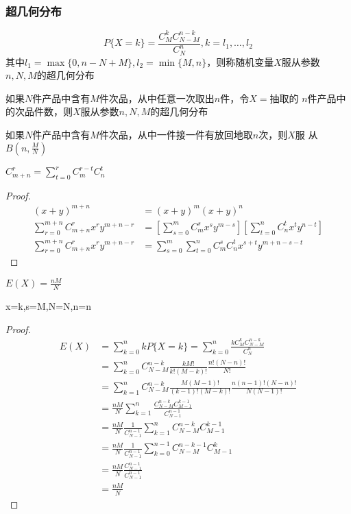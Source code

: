 \documentclass[11pt]{article}
\begin{document}
\subsubsection{超几何分布}
\label{sec:orgff4bd2e}
\begin{equation*}
P\{X=k\}=\frac{C_M^kC_{N-M}^{n-k}}{C_N^n},k=l_1,\dots,l_2
\end{equation*}
其中\(l_1=\max\{0,n-N+M\},l_2=\min\{M,n\}\)，则称随机变量\(X\)服从参数
\(n,N,M\)的超几何分布

如果\(N\)件产品中含有\(M\)件次品，从中任意一次取出\(n\)件，令\(X=\)抽取的
\(n\)件产品中的次品件数，则\(X\)服从参数\(n,N,M\)的超几何分布

如果\(N\)件产品中含有\(M\)件次品，从中一件接一件有放回地取\(n\)次，则\(X\)服
从\(B(n,\frac{M}{N})\)

\begin{lemma}[]
\(C_{m+n}^r=\displaystyle\sum_{t=0}^rC^{r-t}_mC_n^t\)
\end{lemma}

\begin{proof}
\begin{align}
  (x+y)^{m+n} &= (x+y)^m (x+y)^n \\
  \sum\limits_{r=0}^{m+n} C_{m+n}^r x^r y^{m+n-r}
  &= \left[ \sum\limits_{s=0}^m C_m^s x^s y^{m-s} \right]
  \left[ \sum\limits_{t=0}^n C_n^t x^t y^{n-t} \right] \\
  \sum\limits_{r=0}^{m+n} C_{m+n}^r  x^r y^{m+n-r}
  &= \sum\limits_{s=0}^m \sum\limits_{t=0}^n C_m^sC_n^t
  x^{s+t} y^{m+n-s-t}
\end{align}
\end{proof}

\begin{proposition}[]
\(E(X)=\frac{nM}{N}\)
\end{proposition}
x=k,s=M,N=N,n=n
\begin{proof}
\begin{align*}
E(X)&=\sum_{k=0}^nkP\{X=k\}=\sum_{k=0}^n\frac{kC_M^kC_{N-M}^{n-k}}{C_N^n}\\
&=\sum_{k=0}^nC_{N-M}^{n-k}\frac{kM!}{k!(M-k)!}\frac{n!(N-n)!}{N!}\\
&=\sum_{k=1}^nC_{N-M}^{n-k}\frac{M(M-1)!}{(k-1)!(M-k)!}\frac{n(n-1)!(N-n)!}{N(N-1)!}\\
&=\frac{nM}{N}\sum_{k=1}^n\frac{C_{N-M}^{n-k}C_{M-1}^{k-1}}{C_{N-1}^{n-1}}\\
&=\frac{nM}{N}\frac{1}{C_{N-1}^{n-1}}\sum_{k=1}^nC_{N-M}^{n-k}C_{M-1}^{k-1}\\
&=\frac{nM}{N}\frac{1}{C_{N-1}^{n-1}}\sum_{k=0}^{n-1}C_{N-M}^{n-k-1}C_{M-1}^{k}\\
&=\frac{nM}{N}\frac{C_{N-1}^{n-1}}{C_{N-1}^{n-1}}\\
&=\frac{nM}{N}
\end{align*}
\end{proof}
\end{document}
